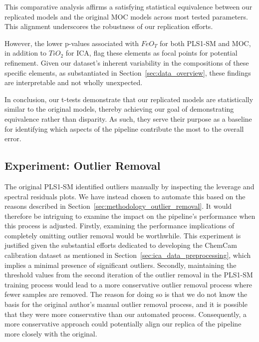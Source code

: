 This comparative analysis affirms a satisfying statistical equivalence between our replicated models and the original MOC models across most tested parameters.
This alignment underscores the robustness of our replication efforts.

However, the lower p-values associated with $FeO_T$ for both PLS1-SM and MOC, in addition to $TiO_2$ for ICA, flag these elements as focal points for potential refinement.
Given our dataset's inherent variability in the compositions of these specific elements, as substantiated in Section~\ref{sec:data_overview}, these findings are interpretable and not wholly unexpected.

In conclusion, our t-tests demonstrate that our replicated models are statistically similar to the original models, thereby achieving our goal of demonstrating equivalence rather than disparity.
As such, they serve their purpose as a baseline for identifying which aspects of the pipeline contribute the most to the overall error. 


\subsection{Experiment: Outlier Removal}\label{sec:experiment_outlier_removal}

The original PLS1-SM identified outliers manually by inspecting the leverage and spectral residuals plots.
We have instead chosen to automate this based on the reasons described in Section~\ref{sec:methodology_outlier_removal}.
It would therefore be intriguing to examine the impact on the pipeline's performance when this process is adjusted.
Firstly, examining the performance implications of completely omitting outlier removal would be worthwhile.
This experiment is justified given the substantial efforts dedicated to developing the ChemCam calibration dataset as mentioned in Section~\ref{sec:ica_data_preprocessing}, which implies a minimal presence of significant outliers.
Secondly, maintaining the threshold values from the second iteration of the outlier removal in the PLS1-SM training process would lead to a more conservative outlier removal process where fewer samples are removed.
The reason for doing so is that we do not know the basis for the original author's manual outlier removal process, and it is possible that they were more conservative than our automated process.
Consequently, a more conservative approach could potentially align our replica of the pipeline more closely with the original.

